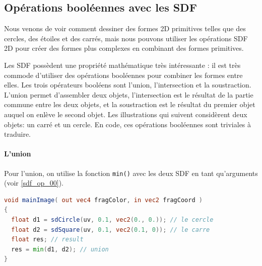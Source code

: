 
\subsection*{Opérations booléennes avec les SDF}


Nous venons de voir comment dessiner des formes 2D primitives telles que des cercles, des étoiles et des carrés, mais nous pouvons utiliser les opérations SDF 2D pour créer des formes plus complexes en combinant des formes primitives.

Les SDF possèdent une propriété mathématique très intéressante : il est très commode d'utiliser des opérations booléennes pour combiner les formes entre elles. Les trois opérateurs booléens sont l'union, l'intersection et la soustraction. L'union permet d'assembler deux objets, l'intersection est le résultat de la partie commune entre les deux objets, et la soustraction est le résultat du premier objet auquel on enlève le second objet. Les illustrations qui suivent considèrent deux objets: un carré et un cercle. En code, ces opérations booléennes sont triviales à traduire. 

\paragraph*{L'union}

Pour l'union, on utilise la fonction \lstinline{min()} avec les deux SDF en tant qu'arguments (voir \ref{sdf_op_00}).

\begin{minipage}{\linewidth}
\begin{lstlisting}[language=GLSL, caption=Union,captionpos=b,frame=single]
void mainImage( out vec4 fragColor, in vec2 fragCoord )
{
  float d1 = sdCircle(uv, 0.1, vec2(0., 0.)); // le cercle
  float d2 = sdSquare(uv, 0.1, vec2(0.1, 0)); // le carre
  float res; // result
  res = min(d1, d2); // union
}
\end{lstlisting}
\end{minipage}


